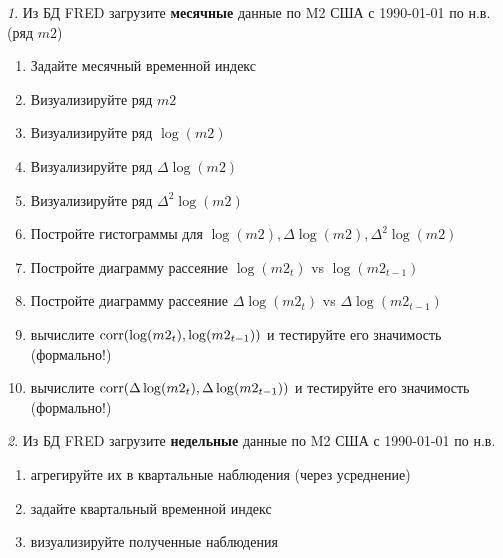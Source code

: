 \documentclass[12pt]{article}
\theoremstyle{remark}
\newtheorem{exercise}{}[subsection]
\begin{document}
\begin{exercise}
Из БД FRED загрузите \textbf{месячные} данные по M2 США с 1990-01-01 по н.в. (ряд \(m2\))
\begin{enumerate}
	\item Задайте месячный временной индекс
	\item Визуализируйте ряд \(m2\)
	\item Визуализируйте ряд \(\log(m2)\)
	\item Визуализируйте ряд \(\Delta\log(m2)\)
	\item Визуализируйте ряд \(\Delta^2\log(m2)\)
	\item Постройте гистограммы для \(\log(m2),\Delta\log(m2),\Delta^2\log(m2)\)
	\item Постройте диаграмму рассеяние \(\log(m2_t)\) vs \(\log(m2_{t-1})\)
	\item Постройте диаграмму рассеяние \(\Delta\log(m2_t)\) vs \(\Delta\log(m2_{t-1})\)
	\item вычислите \(\operatorname{corr}(\log(m2_t), \log(m2_{t-1}))\) и 
	тестируйте его значимость (формально!)
	\item вычислите \(\operatorname{corr}(\Delta\log(m2_t), \Delta\log(m2_{t-1}))\) и 
	тестируйте его значимость (формально!)
\end{enumerate}
\end{exercise}

\begin{exercise}
Из БД FRED загрузите \textbf{недельные} данные по M2 США с 1990-01-01 по н.в.
\begin{enumerate}
	\item агрегируйте их в квартальные наблюдения (через усреднение)
	\item задайте квартальный временной индекс
	\item визуализируйте полученные наблюдения 
\end{enumerate}
\end{exercise}
\end{document}
